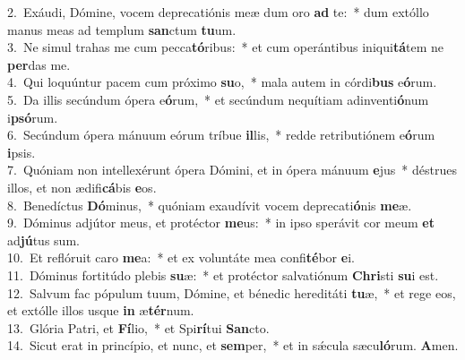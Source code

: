 {2.~}Exáudi, Dómine, vocem deprecatiónis meæ dum oro \textbf{ad} te:~* dum extóllo manus meas ad templum \textbf{san}ctum \textbf{tu}um.\\
{3.~}Ne simul trahas me cum pecca\textbf{tó}ribus:~* et cum operántibus iniqui\textbf{tá}tem ne \textbf{per}das me.\\
{4.~}Qui loquúntur pacem cum próximo \textbf{su}o,~* mala autem in córdi\textbf{bus} e\textbf{ó}rum.\\
{5.~}Da illis secúndum ópera e\textbf{ó}rum,~* et secúndum nequítiam adinventi\textbf{ó}num i\textbf{psó}rum.\\
{6.~}Secúndum ópera mánuum eórum tríbue \textbf{il}lis,~* redde retributiónem e\textbf{ó}rum \textbf{i}psis.\\
{7.~}Quóniam non intellexérunt ópera Dómini, et in ópera mánuum \textbf{e}jus~* déstrues illos, et non ædifi\textbf{cá}bis \textbf{e}os.\\
{8.~}Benedíctus \textbf{Dó}minus,~* quóniam exaudívit vocem deprecati\textbf{ó}nis \textbf{me}æ.\\
{9.~}Dóminus adjútor meus, et protéctor \textbf{me}us:~* in ipso sperávit cor meum \textbf{et} ad\textbf{jú}tus sum.\\
{10.~}Et reflóruit caro \textbf{me}a:~* et ex voluntáte mea confi\textbf{té}bor \textbf{e}i.\\
{11.~}Dóminus fortitúdo plebis \textbf{su}æ:~* et protéctor salvatiónum \textbf{Chri}sti \textbf{su}i est.\\
{12.~}Salvum fac pópulum tuum, Dómine, et bénedic hereditáti \textbf{tu}æ,~* et rege eos, et extólle illos usque \textbf{in} æ\textbf{tér}num.\\
{13.~}Glória Patri, et \textbf{Fí}lio,~* et Spi\textbf{rí}tui \textbf{San}cto.\\
{14.~}Sicut erat in princípio, et nunc, et \textbf{sem}per,~* et in sǽcula sæcu\textbf{ló}rum. \textbf{A}men.\\
